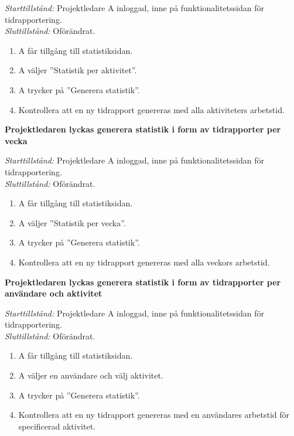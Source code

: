 \documentclass[a4paper]{article}
\begin{document}
\begin{FT}
\emph{Starttillstånd:} Projektledare A inloggad, inne på funktionalitetssidan för tidrapportering.\\
\emph{Sluttillstånd:} Oförändrat.

\begin{enumerate}
\item A får tillgång till statistiksidan.
\item A väljer ''Statistik per aktivitet''.
\item A trycker på ''Generera statistik''.
\item Kontrollera att en ny tidrapport genereras med alla aktiviteters arbetstid.
\end{enumerate}


\item
\textbf{Projektledaren lyckas generera statistik i form av tidrapporter per vecka}

\emph{Starttillstånd:} Projektledare A inloggad, inne på funktionalitetssidan för tidrapportering.\\
\emph{Sluttillstånd:} Oförändrat.

\begin{enumerate}
\item A får tillgång till statistiksidan.
\item A väljer ''Statistik per vecka''.
\item A trycker på ''Generera statistik''.
\item Kontrollera att en ny tidrapport genereras med alla veckors arbetstid.
\end{enumerate}


\item
\textbf{Projektledaren lyckas generera statistik i form av tidrapporter per användare och aktivitet}

\emph{Starttillstånd:} Projektledare A inloggad, inne på funktionalitetssidan för tidrapportering.\\
\emph{Sluttillstånd:} Oförändrat.

\begin{enumerate}
\item A får tillgång till statistiksidan.
\item A väljer en användare och välj aktivitet.
\item A trycker på ''Generera statistik''.
\item Kontrollera att en ny tidrapport genereras med en användares arbetstid för specificerad aktivitet.
\end{enumerate}



\end{FT}
\end{document}
